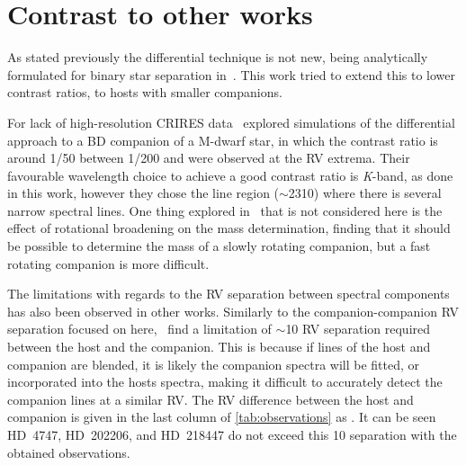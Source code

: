 
\section{Contrast to other works}
\label{sec:differential_contrast}
As stated previously the differential technique is not new, being analytically formulated for binary star separation in~\citet{ferluga_separating_1997}.
This work tried to extend this to lower contrast ratios, to hosts with smaller companions.

For lack of high-resolution CRIRES data~\citet{kostogryz_spectral_2013} explored simulations of the differential approach to a {BD} companion of a {M-dwarf} star, in which the contrast ratio is around 1/50 between 1/200 and were observed at the {RV} extrema.
Their favourable wavelength choice to achieve a good contrast ratio is \emph{K}-band, as done in this work, however they chose the  line region (\(\sim\)2310\nm{}) where there is several narrow spectral lines.
One thing explored in~\citet{kostogryz_spectral_2013} that is not considered here is the effect of rotational broadening on the mass determination, finding that it should be possible to determine the mass of a slowly rotating companion, but a fast rotating companion is more difficult.

The limitations with regards to the {RV} separation between spectral components has also been observed in other works.
Similarly to the companion-companion {RV} separation focused on here,~\citet{kolbl_detection_2015} find a limitation of \(\sim\)10\kmps{} {RV} separation required between the host and the companion.
This is because if lines of the host and companion are blended, it is likely the companion spectra will be fitted, or incorporated into the hosts spectra, making it difficult to accurately detect the companion lines at a similar {RV}.
The {RV} difference between the host and companion is given in the last column of \cref{tab:observations} as \Rvtwo{}.
It can be seen {HD~4747}, {HD~202206}, and {HD~218447} do not exceed this 10\kmps{} separation with the obtained observations.

